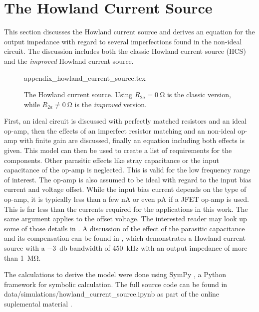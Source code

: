 \documentclass[12pt]{book}
\providecommand{\external}[1]{\textsf{#1}}
\begin{document}
\section{The Howland Current Source}
\label{sec:appendix_howland_current_source}
This section discusses the Howland current source and derives an equation for the output impedance with regard to several imperfections found in the non-ideal circuit. The discussion includes both the classic Howland current source (HCS) \cite{howland_current_source} and the \textit{improved} Howland current source.
\begin{figure}[ht]
    \centering
    {appendix_howland_current_source.tex}
    \caption{The Howland current source. Using $R_{2a} = \qty{0}{\ohm}$ is the classic version, while $R_{2a} \neq \qty{0}{\ohm}$ is the \textit{improved} version.}
    \label{fig:appendix_howland_current_source}
\end{figure}

First, an ideal circuit is discussed with perfectly matched resistors and an ideal op-amp, then the effects of an imperfect resistor matching and an non-ideal op-amp with finite gain are discussed, finally an equation including both effects is  given. This model can then be used to create a list of requirements for the components. Other parasitic effects like stray capacitance or the input capacitance of the op-amp is neglected. This is valid for the low frequency range of interest. The op-amp is also assumed to be ideal with regard to the input bias current and voltage offset. While the input bias current depends on the type of op-amp, it is typically less than a few \unit{\nA} or even \unit{\pA} if a JFET op-amp is used. This is far less than the currents required for the applications in this work. The same argument applies to the offset voltage. The interested reader may look up some of those details in \cite{howland_comprehensive}. A discussion of the effect of the parasitic capacitance and its compensation can be found in \cite{howland_current_source_compensation}, which demonstrates a Howland current source with a \qty{-3}{\decibel} bandwidth of \qty{450}{\kHz} with an output impedance of more than \qty{1}{\mega\ohm}.

The calculations to derive the model were done using SymPy \cite{sympy}, a Python framework for symbolic calculation. The full source code can be found in \external{data/simulations/howland\_current\_source.ipynb} as part of the online suplemental material \cite{supplemental_material}.
\end{document}
